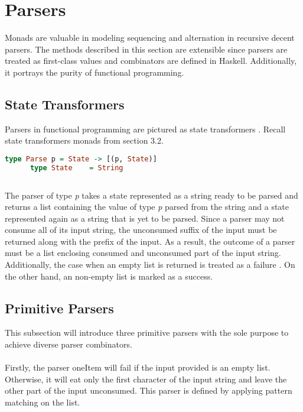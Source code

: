 \documentclass[a4paper, onecolumn]{article}
\begin{document}
    \section{Parsers}
    Monads are valuable in modeling sequencing and alternation in recursive decent parsers. The methods described in this section are extensible since parsers are treated as first-class values and combinators are defined in Haskell. Additionally, it portrays the purity of functional programming.
    
    \subsection{State Transformers}
    
    Parsers in functional programming are pictured as state transformers \cite{original}. Recall state transformers monads from section 3.2.  
    
    \begin{tcolorbox}
      \begin{lstlisting}[language=Haskell]
      type Parse p = State -> [(p, State)]
      type State    = String  
      
      \end{lstlisting}
    \end{tcolorbox}
    
    The parser of type \textit{p} takes a state represented as a string ready to be parsed and returns a list containing the value of type \textit{p} parsed from the string and a state represented again as a string that is yet to be parsed. Since a parser may not consume all of its input string, the unconsumed suffix of the input must be returned along with the prefix of the input. As a result, the outcome of a parser must be a list enclosing consumed and unconsumed part of the input string. Additionally, the case when an empty list is returned is treated as a failure \cite{pearls}. On the other hand, an non-empty list is marked as a success.
    
    \subsection{Primitive Parsers}
    
    This subsection will introduce three primitive parsers with the sole purpose to achieve diverse parser combinators. \\ \\
    Firstly, the parser oneItem will fail if the input provided is an empty list. Otherwise, it will eat only the first character of the input string and leave the other part of the input unconsumed. This parser is defined by applying pattern matching on the list. 
     
\end{document}
